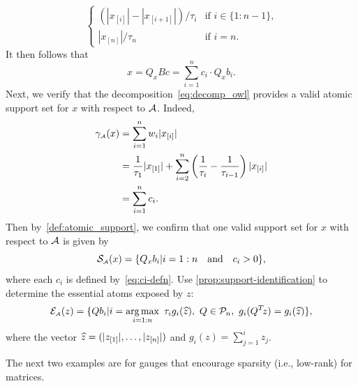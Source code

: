 \begin{example}
\begin{equation}
\begin{cases}
      (|x_{[i]}| - |x_{[i+1]}|)/\tau_i & \mbox{if $i\in\{1:n-1\}$,}
    \\|x_{[n]}|/\tau_n                 & \mbox{if $i=n$.}
    \end{cases}
  \end{equation}
  It then follows that
  \begin{equation} \label{eq:decomp_owl}
    x = Q_xBc = \sum_{i = 1}^n c_i\cdot Q_xb_i.
  \end{equation}
  Next, we verify that the decomposition~\eqref{eq:decomp_owl} provides a valid
  atomic support set for $x$ with respect to $\mathcal{A}$. Indeed, 
  \begin{align*}
    \gamma_{\scriptscriptstyle\mathcal{A}}(x)
      &= \sum_{i = 1}^n w_i|x_{[i]}|
    \\&= \frac{1}{\tau_1}|x_{[1]}| + \sum_{i = 2}^n\left(\frac{1}{\tau_i} - \frac{1}{\tau_{i-1}}\right)|x_{[i]}|
    \\&= \sum_{i = 1}^n c_i.
  \end{align*}
  Then by~\autoref{def:atomic_support}, we confirm that one valid support set for $x$ with
  respect to $\mathcal{A}$ is given by 
  \[
    \operatorname{\mathcal{S}_{\scriptscriptstyle\mathcal{A}}}(x) = \{Q_xb_i | i = 1:n \hbox{\quad and\quad} c_i > 0\},
  \]
  where each $c_i$ is defined by~\eqref{eq:ci-defn}. Use 
  \autoref{prop:support-identification} to determine the essential atoms
  exposed by $z$:
  \[
    \Escr\As(z) =
    \{Qb_i |
    i = \argmax{i = 1:n}\tau_ig_i(\zhat), \ Q \in \Pscr_n, \ g_i(Q\T z) = g_i(\zhat)\},
  \]
  where the vector $\zhat = (|z_{[1]}|, \dots, |z_{[n]}|)$ and $g_i(z) = \sum_{j = 1}^i z_j$.

\end{example}

The next two examples are for gauges that encourage sparsity (i.e.,
low-rank) for matrices.

